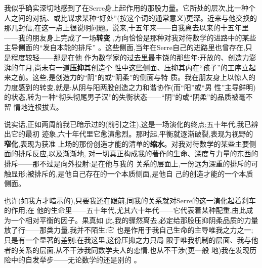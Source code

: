 \pmark{}我似乎确实深切地感到了在Serre身上起作用的那股力量。它所处的层次,比一种个人之间的对抗、或比谋求某种“好处”(按这个词的通常意义)更深。近来与他交换的那几封信,在这一点上很说明问题。说来,十五年来——自我离去以来的十五年里——我的朋友身上完成了一场\textbf{转变}
,方向恰恰是那种对我对待数学的进路中的某些主导侧面的“发自本能的排斥”
\dmark{}。这些侧面,当年在Serre自己的进路里也曾存在,只是程度较轻——那是在他
作为数学家的过去里最丰饶的那些年:开放的、创造力澎湃的年月,尚未有一道\textbf{压抑}其创造个
性中这些侧面、压抑其内在“孩子”的工序立起来之前。这些,是创造力的“阴”的或“阴柔”的侧面与特
质。我在朋友身上以惊人的力度感到的转变,就是:从阴与阳两股创造之力和谐协作(而“阳”或“男
性”主导鲜明)的状态,转为一种“彻头彻尾男子汉”的失衡状态——“阴”的或“阴柔”的品质被毫不留
情地连根拔去。

说实话,正如两周前我已暗示过的(前引之注),这是一场演化的终点;五十年代,我已辨出它的最初
迹象,六十年代里它愈演愈烈。那时起,平衡就逐渐破裂,表现为视野的\textbf{窄化},表现为获准
上场的那份创造才能的清单的\textbf{缩水}。对我对待数学的某些主要侧面的排斥反应,以及渐渐地,
对一切真正构成我的著作的生命、深度与力量的东西的排斥——那不过是向外投射:是在他与我的
关系的层面上,一份远为深重的排斥的可触显形;被排斥的,是他自己存在的一个本质侧面,是他自
己的创造才能的一个本质侧面。

也许(如我方才暗示的),只要我还在跟前,同我的关系就对Serre的这一演化起着刹车的作用;在
他的生命里——五十年代,尤其六十年代——它代表着某种配重,由此成为一个相对平衡的因子。果真如
此,我的骤然离去,必定给那股压抑阴柔品质的力量放了行——那类力量,我并不陌生:它
也是作用于我自己生命的主导唯我之力之一;只是有一个显著的差别:在我这里,这份压抑之力只局
限于唯我机制的层面、我与他者的关系的层面,\dmark{}从不干涉我同数学夫人的恋情,也从不干涉(更一般
地)我在发现历险中的自发举步——无论数学的还是别的
。

